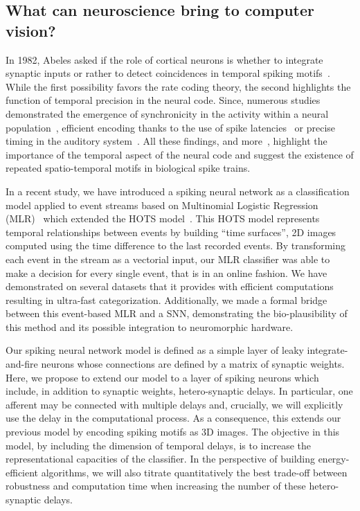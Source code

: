 \documentclass[default]{sn-jnl}%
\theoremstyle{thmstyleone}%
\theoremstyle{thmstyletwo}%
\theoremstyle{thmstylethree}%
\begin{document}
\subsection{What can neuroscience bring to computer vision?}%


In 1982, Abeles asked if the role of cortical neurons is whether to integrate synaptic inputs or rather to detect coincidences in temporal spiking motifs~\citep{abeles_role_1982}. While the first possibility favors the rate coding theory, the second highlights the function of temporal precision in the neural code. Since, numerous studies demonstrated the emergence of synchronicity in the activity within a neural population~\citep{riehle_spike_1997, davis_spontaneous_2021}, efficient encoding thanks to the use of spike latencies~\citep{perrinet_coding_2004, gollisch_rapid_2008} or precise timing in the auditory system~\citep{deweese_binary_2002, carr_circuit_1990}. All these findings, and more~\citep{bohte_evidence_2004}, highlight the importance of the temporal aspect of the neural code and suggest the existence of repeated spatio-temporal motifs in biological spike trains.

In a recent study, we have introduced a spiking neural network as a classification model applied to event streams based on Multinomial Logistic Regression (MLR)~\citep{grimaldi_robust_2022} which extended the HOTS model~\citet{lagorce_hots_2017}. This HOTS model represents temporal relationships between events by building ``time surfaces'', 2D images computed using the time difference to the last recorded events. By transforming each event in the stream as a vectorial input, our MLR classifier was able to make a decision for every single event, that is in an online fashion. We have demonstrated on several datasets that it provides with efficient computations resulting in ultra-fast categorization. Additionally, we made a formal bridge between this event-based MLR and a SNN, demonstrating the bio-plausibility of this method and its possible integration to neuromorphic hardware.

Our spiking neural network model is defined as a simple layer of leaky integrate-and-fire neurons whose connections are defined by a matrix of synaptic weights. Here, we propose to extend our model to a layer of spiking neurons which include, in addition to synaptic weights, hetero-synaptic delays. In particular, one afferent may be connected with multiple delays and, crucially, we will explicitly use the delay in the computational process. As a consequence, this extends our previous model by encoding spiking motifs as 3D images. The objective in this model, by including the dimension of temporal delays, is to increase the representational capacities of the classifier. In the perspective of building energy-efficient algorithms, we will also titrate quantitatively the best trade-off between robustness and computation time when increasing the number of these hetero-synaptic delays. %
\end{document}

